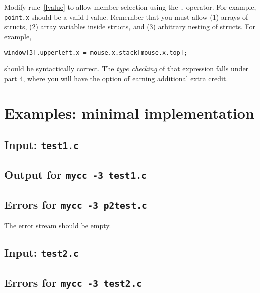 \documentclass{article}
\newcommand{\thispart}{3}
\newcommand{\typecheck}{4}
\begin{document}
Modify rule~\ref{lvalue} to allow member selection using the
{\tt .} operator.
For example,
\lstinline{point.x}
should be a valid l-value.
Remember that you must allow (1) arrays of structs,
(2) array variables inside structs, and (3) arbitrary nesting of structs.
For example,
\begin{lstlisting}[numbers=none]
  window[3].upperleft.x = mouse.x.stack[mouse.x.top];
\end{lstlisting}
should be syntactically correct.
The \emph{type checking} of that expression falls under part \typecheck,
where you will have the option of earning additional extra credit.



\section{Examples: minimal implementation} \label{SEC:exmin}

\subsection{Input: {\tt test1.c}}



\subsection{Output for {\tt mycc -\thispart{} test1.c}}



\subsection{Errors for {\tt mycc -\thispart{} p2test.c}}

The error stream should be empty.

\subsection{Input: {\tt test2.c}}



\subsection{Errors for {\tt mycc -\thispart{} test2.c}}
\end{document}
